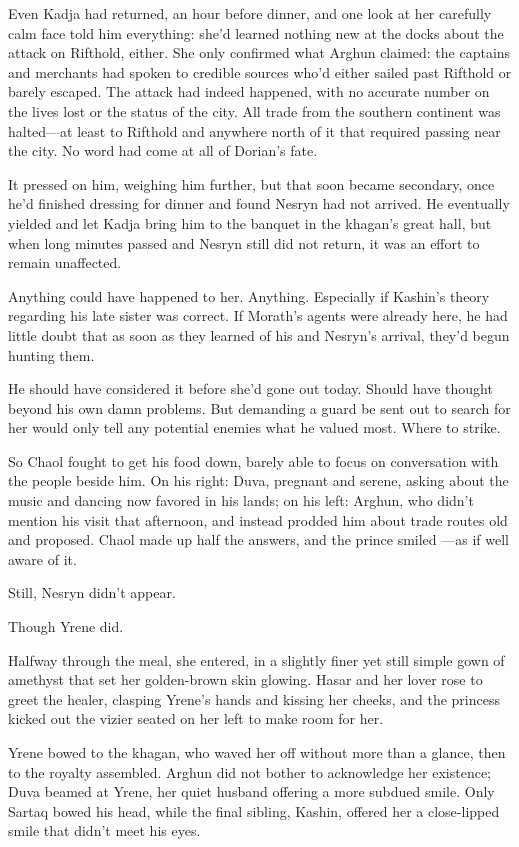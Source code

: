 Even Kadja had returned, an hour before dinner, and one look at her carefully calm face told him everything: she'd learned nothing new at the docks about the attack on Rifthold, either.
She only confirmed what Arghun claimed: the captains and merchants had spoken to credible sources who'd either sailed past Rifthold or barely escaped.
The attack had indeed happened, with no accurate number on the lives lost or the status of the city.
All trade from the southern continent was halted---at least to Rifthold and anywhere north of it that required passing near the city.
No word had come at all of Dorian's fate.

It pressed on him, weighing him further, but that soon became secondary, once he'd finished dressing for dinner and found Nesryn had not arrived.
He eventually yielded and let Kadja bring him to the banquet in the khagan's great hall, but when long minutes passed and Nesryn still did not return, it was an effort to remain unaffected.

Anything could have happened to her.
Anything.
Especially if Kashin's theory regarding his late sister was correct.
If Morath's agents were already here, he had little doubt that as soon as they learned of his and Nesryn's arrival, they'd begun hunting them.

He should have considered it before she'd gone out today.
Should have thought beyond his own damn problems.
But demanding a guard be sent out to search for her would only tell any potential enemies what he valued most.
Where to strike.

So Chaol fought to get his food down, barely able to focus on conversation with the people beside him.
On his right: Duva, pregnant and serene, asking about the music and dancing now favored in his lands; on his left: Arghun, who didn't mention his visit that afternoon, and instead prodded him about trade routes old and proposed.
Chaol made up half the answers, and the prince smiled ---as if well aware of it.

Still, Nesryn didn't appear.

Though Yrene did.

Halfway through the meal, she entered, in a slightly finer yet still simple gown of amethyst that set her golden-brown skin glowing.
Hasar and her lover rose to greet the healer, clasping Yrene's hands and kissing her cheeks, and the princess kicked out the vizier seated on her left to make room for her.

Yrene bowed to the khagan, who waved her off without more than a glance, then to the royalty assembled.
Arghun did not bother to acknowledge her existence; Duva beamed at Yrene, her quiet husband offering a more subdued smile.
Only Sartaq bowed his head, while the final sibling, Kashin, offered her a close-lipped smile that didn't meet his eyes.

